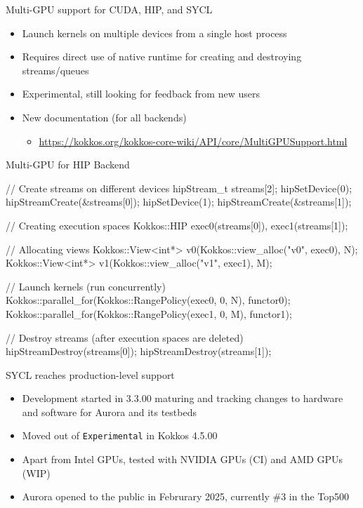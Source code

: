 \begin{frame}[fragile]{Multi-GPU support for CUDA, HIP, and SYCL}
  \begin{itemize}
    \item Launch kernels on multiple devices from a single host process
    \item Requires direct use of native runtime for creating and destroying streams/queues
    \item Experimental, still looking for feedback from new users
    \item New documentation (for all backends)  
      \begin{itemize} 
        \item[] \url{https://kokkos.org/kokkos-core-wiki/API/core/MultiGPUSupport.html}
      \end{itemize}
  \end{itemize}
\end{frame}

\begin{frame}[fragile]{Multi-GPU for HIP Backend}
  \begin{code}[keywords={auto}]
// Create streams on different devices
hipStream_t streams[2];
hipSetDevice(0); hipStreamCreate(&streams[0]);
hipSetDevice(1); hipStreamCreate(&streams[1]);
{
  // Creating execution spaces 
  Kokkos::HIP exec0(streams[0]), exec1(streams[1]);

  // Allocating views
  Kokkos::View<int*> v0(Kokkos::view_alloc("v0", exec0), N);
  Kokkos::View<int*> v1(Kokkos::view_alloc("v1", exec1), M);

  // Launch kernels (run concurrently)
  Kokkos::parallel_for(Kokkos::RangePolicy(exec0, 0, N), functor0);
  Kokkos::parallel_for(Kokkos::RangePolicy(exec1, 0, M), functor1);
}
// Destroy streams (after execution spaces are deleted)
hipStreamDestroy(streams[0]); hipStreamDestroy(streams[1]);
  \end{code}
\end{frame}


\begin{frame}[fragile]{SYCL reaches production-level support}
  \begin{itemize}
    \item Development started in 3.3.00 maturing and tracking changes to hardware and software for Aurora and its testbeds
    \item Moved out of \texttt{Experimental} in Kokkos 4.5.00
    \item Apart from Intel GPUs, tested with NVIDIA GPUs (CI) and AMD GPUs (WIP)
    \item Aurora opened to the public in Februrary 2025, currently \#3 in the Top500
  \end{itemize}
\end{frame}

